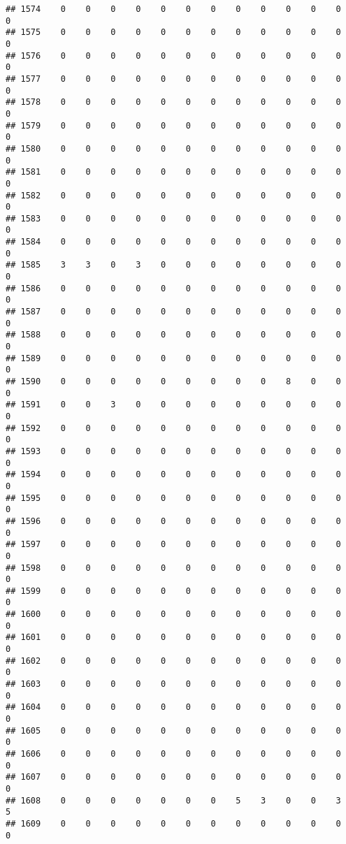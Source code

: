 \documentclass[]{article}
\begin{document}
\begin{verbatim}
## 1574    0    0    0    0    0    0    0    0    0    0    0    0    0
## 1575    0    0    0    0    0    0    0    0    0    0    0    0    0
## 1576    0    0    0    0    0    0    0    0    0    0    0    0    0
## 1577    0    0    0    0    0    0    0    0    0    0    0    0    0
## 1578    0    0    0    0    0    0    0    0    0    0    0    0    0
## 1579    0    0    0    0    0    0    0    0    0    0    0    0    0
## 1580    0    0    0    0    0    0    0    0    0    0    0    0    0
## 1581    0    0    0    0    0    0    0    0    0    0    0    0    0
## 1582    0    0    0    0    0    0    0    0    0    0    0    0    0
## 1583    0    0    0    0    0    0    0    0    0    0    0    0    0
## 1584    0    0    0    0    0    0    0    0    0    0    0    0    0
## 1585    3    3    0    3    0    0    0    0    0    0    0    0    0
## 1586    0    0    0    0    0    0    0    0    0    0    0    0    0
## 1587    0    0    0    0    0    0    0    0    0    0    0    0    0
## 1588    0    0    0    0    0    0    0    0    0    0    0    0    0
## 1589    0    0    0    0    0    0    0    0    0    0    0    0    0
## 1590    0    0    0    0    0    0    0    0    0    8    0    0    0
## 1591    0    0    3    0    0    0    0    0    0    0    0    0    0
## 1592    0    0    0    0    0    0    0    0    0    0    0    0    0
## 1593    0    0    0    0    0    0    0    0    0    0    0    0    0
## 1594    0    0    0    0    0    0    0    0    0    0    0    0    0
## 1595    0    0    0    0    0    0    0    0    0    0    0    0    0
## 1596    0    0    0    0    0    0    0    0    0    0    0    0    0
## 1597    0    0    0    0    0    0    0    0    0    0    0    0    0
## 1598    0    0    0    0    0    0    0    0    0    0    0    0    0
## 1599    0    0    0    0    0    0    0    0    0    0    0    0    0
## 1600    0    0    0    0    0    0    0    0    0    0    0    0    0
## 1601    0    0    0    0    0    0    0    0    0    0    0    0    0
## 1602    0    0    0    0    0    0    0    0    0    0    0    0    0
## 1603    0    0    0    0    0    0    0    0    0    0    0    0    0
## 1604    0    0    0    0    0    0    0    0    0    0    0    0    0
## 1605    0    0    0    0    0    0    0    0    0    0    0    0    0
## 1606    0    0    0    0    0    0    0    0    0    0    0    0    0
## 1607    0    0    0    0    0    0    0    0    0    0    0    0    0
## 1608    0    0    0    0    0    0    0    5    3    0    0    3    5
## 1609    0    0    0    0    0    0    0    0    0    0    0    0    0

\end{verbatim}
\end{document}
